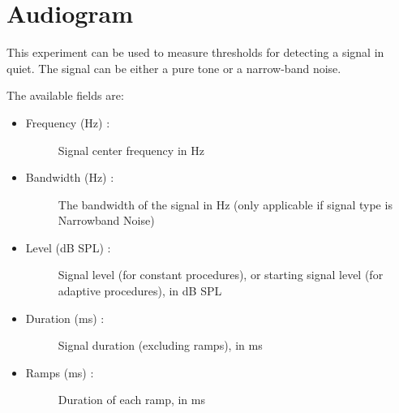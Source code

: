\documentclass[a4paper,12pt,english]{sphinxmanual}
\begin{document}
\section{Audiogram}
\label{default_experiments:audiogram}\label{default_experiments:module-pychoacoustics.default_experiments.audiogram}
This experiment can be used to measure thresholds for detecting a signal in quiet.
The signal can be either a pure tone or a narrow-band noise.

The available fields are:
\begin{itemize}
\item {} \begin{description}
\item[{Frequency (Hz) :}] \leavevmode
Signal center frequency in Hz

\end{description}

\item {} \begin{description}
\item[{Bandwidth (Hz) :}] \leavevmode
The bandwidth of the signal in Hz (only applicable if
signal type is Narrowband Noise)

\end{description}

\item {} \begin{description}
\item[{Level (dB SPL) :}] \leavevmode
Signal level (for constant procedures), or starting signal level
(for adaptive procedures), in dB SPL

\end{description}

\item {} \begin{description}
\item[{Duration (ms) :}] \leavevmode
Signal duration (excluding ramps), in ms

\end{description}

\item {} \begin{description}
\item[{Ramps (ms) :}] \leavevmode
Duration of each ramp, in ms

\end{description}

\end{itemize}
\end{document}

